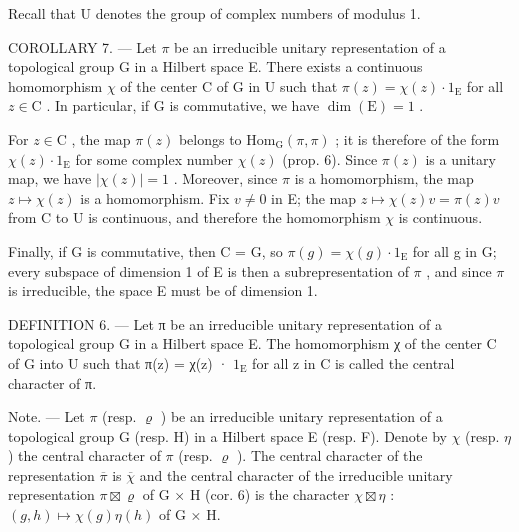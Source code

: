 Recall that U denotes the group of complex numbers of modulus 1.

COROLLARY 7. --- Let \(\pi\) be an irreducible unitary representation of a topological group G in a Hilbert space E. There exists a continuous homomorphism \(\chi\) of the center C of G in U such that \(\pi(z) = \chi(z) \cdot 1_{\mathrm{E}}\) for all \(z \in \mathrm{C}\) . In particular, if G is commutative, we have \(\dim(\mathrm{E}) = 1\) .

For \(z \in \mathrm{C}\) , the map \(\pi(z)\) belongs to \(\mathrm{Hom}_{\mathrm{G}}(\pi, \pi)\) ; it is therefore of the form \(\chi(z) \cdot 1_{\mathrm{E}}\) for some complex number \(\chi(z)\) (prop. 6). Since \(\pi(z)\) is a unitary map, we have \(|\chi(z)| = 1\) . Moreover, since \(\pi\) is a homomorphism, the map \(z \mapsto \chi(z)\) is a homomorphism. Fix \(v \neq 0\) in E; the map \(z \mapsto \chi(z)v = \pi(z)v\) from C to U is continuous, and therefore the homomorphism \(\chi\) is continuous.

Finally, if G is commutative, then C = G, so \(\pi(g) = \chi(g) \cdot 1_{\mathrm{E}}\) for all g in G; every subspace of dimension 1 of E is then a subrepresentation of \(\pi\) , and since \(\pi\) is irreducible, the space E must be of dimension 1.

DEFINITION 6. --- Let π be an irreducible unitary representation of a topological group G in a Hilbert space E. The homomorphism χ of the center C of G into U such that π(z) = χ(z) · \(1_{\mathrm{E}}\) for all z in C is called the central character of π.

Note. --- Let \(\pi\) (resp. \(\varrho\) ) be an irreducible unitary representation of a topological group G (resp. H) in a Hilbert space E (resp. F). Denote by \(\chi\) (resp. \(\eta\) ) the central character of \(\pi\) (resp. \(\varrho\) ). The central character of the representation \(\overline{\pi}\) is \(\overline{\chi}\) and the central character of the irreducible unitary representation \(\pi \boxtimes \varrho\) of G × H (cor. 6) is the character \(\chi \boxtimes \eta\) : \((g, h) \mapsto \chi(g)\eta(h)\) of G × H.

